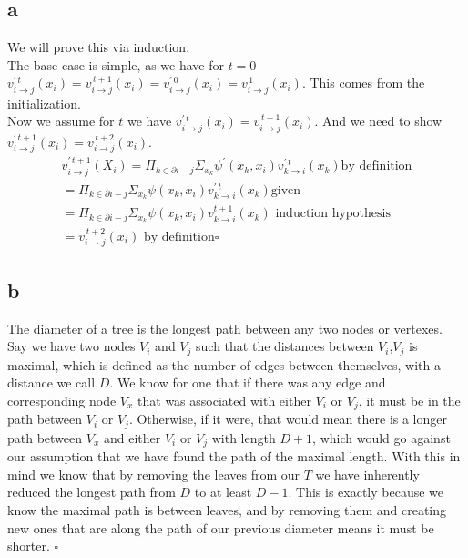 \documentclass[12pt]{article}
\begin{document}
\subsection{a}
We will prove this via induction. 
\\
The base case is simple, as we have for $t=0$
$v^{\prime \, t}_{i\rightarrow j}(x_i) =v^{\, t+1}_{i\rightarrow j}(x_i) = v^{\prime \, 0}_{i\rightarrow j}(x_i) =v^{\, 1}_{i\rightarrow j}(x_i) $. This comes from the initialization.
\\
Now we assume for $t$ we have $v^{\prime \, t}_{i\rightarrow j}(x_i) =v^{\, t+1}_{i\rightarrow j}(x_i)$. And we need to show $v^{\prime \, t+1}_{i\rightarrow j}(x_i) =v^{\, t+2}_{i\rightarrow j}(x_i)$.
\begin{gather}
	v^{\prime \, t+1}_{i\rightarrow j}(X_i) = \Pi_{k\in \partial i - j} \Sigma_{x_k} \psi^\prime(x_k,x_i)v^{\prime \, t}_{k\rightarrow i}(x_k) \text{by definition}\\
	= \Pi_{k\in \partial i - j} \Sigma_{x_k} \psi(x_k,x_i)v^{\prime \, t}_{k\rightarrow i}(x_k) \text{given}\\
	= \Pi_{k\in \partial i - j} \Sigma_{x_k} \psi(x_k,x_i)v^{t+1}_{k\rightarrow i}(x_k) \text{ induction hypothesis}\\
	= v^{\, t+2}_{i\rightarrow j}(x_i) \text{ by definition} \square
\end{gather}
\subsection{b}
The diameter of a tree is the longest path between any two nodes or vertexes. Say we have two nodes $V_i$ and $V_j$ such that the distances between $V_i$,$V_j$ is maximal, which is defined as the number of edges between themselves, with a distance we call $D$. We know for one that if there was any edge and corresponding node $V_x$ that was associated with either $V_i$ or $V_j$, it must be in the path between $V_i$ or $V_j$. Otherwise, if it were, that would mean there is a longer path between $V_x$ and either $V_i$ or $V_j$ with length $D+1$, which would go against our assumption that we have found the path of the maximal length. With this in mind we know that by removing the leaves from our $T$ we have inherently reduced the longest path from $D$ to at least $D-1$. This is exactly because we know the maximal path is between leaves, and by removing them and creating new ones that are along the path of our previous diameter means it must be shorter. $\square$
\end{document}

